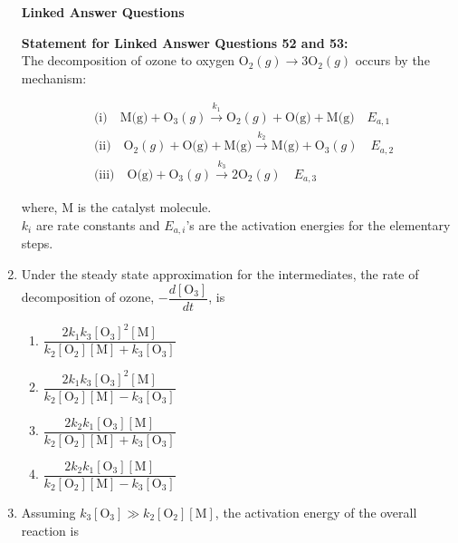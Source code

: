 \documentclass[journal,12pt,onecolumn]{IEEEtran}
\theoremstyle{remark}
\begin{document}
\begin{enumerate}
\noindent\textbf{Linked Answer Questions}
 
\noindent\textbf{Statement for Linked Answer Questions 52 and 53:}
 \\
The decomposition of ozone to oxygen \( \text{O}_2 (g) \rightarrow 3\text{O}_2(g) \) occurs by the mechanism:

\begin{align*}
&\text{(i)} \quad \text{M(g)} + \text{O}_3 (g) \xrightarrow{k_1} \text{O}_2 (g) + \text{O(g)} + \text{M(g)} \quad E_{a,1} \\
&\text{(ii)} \quad \text{O}_2 (g) + \text{O(g)} + \text{M(g)} \xrightarrow{k_2} \text{M(g)} + \text{O}_3 (g) \quad E_{a,2} \\
&\text{(iii)} \quad \text{O(g)} + \text{O}_3 (g) \xrightarrow{k_3} 2\text{O}_2 (g) \quad E_{a,3}
\end{align*}

where, M is the catalyst molecule.\\
\(k_i\) are rate constants and \(E_{a,i}\)'s are the activation energies for the elementary steps.

 

\item    \hspace{0.5cm} Under the steady state approximation for the intermediates, the rate of decomposition of ozone, \( -\dfrac{d[\text{O}_3]}{dt} \), is  \hfill{}

\begin{multicols}{2}
\begin{enumerate}
    \item \( \dfrac{2k_1k_3[\text{O}_3]^2[\text{M}]}{k_2[\text{O}_2][\text{M}] + k_3[\text{O}_3]} \)
    \item \( \dfrac{2k_1k_3[\text{O}_3]^2[\text{M}]}{k_2[\text{O}_2][\text{M}] - k_3[\text{O}_3]} \)
    \item \( \dfrac{2k_2k_1[\text{O}_3][\text{M}]}{k_2[\text{O}_2][\text{M}] + k_3[\text{O}_3]} \)
    \item \( \dfrac{2k_2k_1[\text{O}_3][\text{M}]}{k_2[\text{O}_2][\text{M}] - k_3[\text{O}_3]} \)
\end{enumerate}
\end{multicols}

 

\item    \hspace{0.5cm} Assuming \(k_3[\text{O}_3] \gg k_2[\text{O}_2][\text{M}]\), the activation energy of the overall reaction is  \hfill{}


\end{enumerate}
\end{document}

